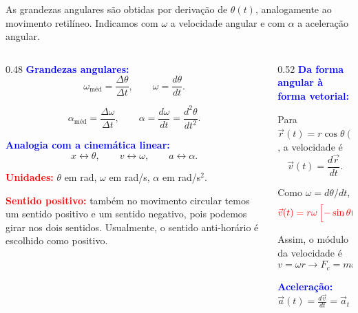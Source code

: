 \documentclass{beamer}
\begin{document}
	
	\begin{frame}{}
		\scriptsize
		
	As grandezas angulares são obtidas por derivação de $\theta(t)$, analogamente ao movimento retilíneo. Indicamos com $	\omega$ a velocidade angular e com $\alpha$ a aceleração angular.
		
		\vspace{0.1cm}
		\begin{columns}[T]
			\begin{column}{0.48\textwidth}
				\textcolor{blue}{\textbf{Grandezas angulares:}}
				\[
				\omega_{\text{méd}}=\frac{\Delta\theta}{\Delta t},
				\qquad
				\omega=\frac{d\theta}{dt}.
				\]
				
				\[
				\alpha_{\text{méd}}=\frac{\Delta\omega}{\Delta t},
				\qquad
				\alpha=\frac{d\omega}{dt}
				=
				\frac{d^2\theta}{dt^2}.
				\]
				
				\vspace{0.1cm}
				\textcolor{blue}{\textbf{Analogia com a cinemática linear:}}
				\[
				x \longleftrightarrow \theta,
				\qquad
				v \longleftrightarrow \omega,
				\qquad
				a \longleftrightarrow \alpha.
				\]
				
				\textcolor{red}{\textbf{Unidades:}} 
				\(\theta\) em rad, \(\omega\) em rad/s, \(\alpha\) em rad/s\(^2\).
				
				\vspace{0.1cm}
				\textcolor{red}{\textbf{Sentido positivo:}} também no movimento circular temos um sentido positivo e um sentido negativo, pois podemos girar nos dois sentidos. Usualmente, o sentido anti-horário é escolhido como positivo.
			\end{column}
			
			\begin{column}{0.52\textwidth}
				\textcolor{blue}{\textbf{Da forma angular à forma vetorial:}}
				
				Para \(\vec r(t)=r\cos\theta(t)\vec i+r\sin\theta(t)\vec j\), a velocidade é
				\[
				\vec v(t)=\frac{d\vec r}{dt}.
				\]
				
				Como \(\omega=d\theta/dt\),
				\[
				\textcolor{red}{
					\vec v(t)=
					r\omega\left[-\sin\theta(t)\vec i+\cos\theta(t)\vec j\right].}
				\]
				
				Assim, o módulo da velocidade é
				\[
				v=\omega r \rightarrow F_c= m \omega^2 r
				\]
				
				\vspace{0.05cm}
				\textcolor{blue}{\textbf{Aceleração:}}
				$\vec a(t)=\frac{d\vec v}{dt}
				=
				\vec a_t+\vec a_r.
				$
				

\end{column}
\end{columns}
\end{frame}
\end{document}
